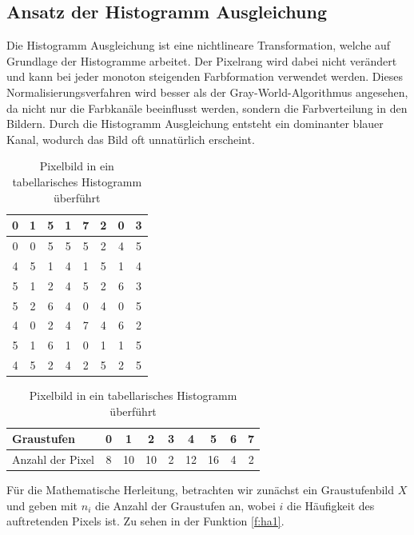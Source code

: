   \subsection{Ansatz der Histogramm Ausgleichung}\label{s.ha}  
Die Histogramm Ausgleichung \cite{goatman2003colour} ist eine nichtlineare Transformation, welche auf Grundlage der Histogramme arbeitet. Der Pixelrang wird dabei nicht verändert und kann bei jeder monoton steigenden Farbformation verwendet werden. Dieses Normalisierungsverfahren wird besser als der Gray-World-Algorithmus angesehen, da nicht nur die Farbkanäle beeinflusst werden, sondern die Farbverteilung in den Bildern. Durch die Histogramm Ausgleichung entsteht ein dominanter blauer Kanal, wodurch das Bild oft unnatürlich erscheint.
   \begin{table}
  [h]
  \centering
  \caption{Pixelbild in ein tabellarisches Histogramm überführt}
  \label{tab:bildha}
  \begin{minipage}{\textwidth}
  \center
  \begin{tabular}{|c|c|c|c|c|c|c|c|}
  \hline
  0&1&5&1&7&2&0&3\\
  \hline
  0&0&5&5&5&2&4&5\\
  \hline
  4&5&1&4&1&5&1&4\\
  \hline
  5&1&2&4&5&2&6&3\\
  \hline
  5&2&6&4&0&4&0&5\\
  \hline
  4&0&2&4&7&4&6&2\\
  \hline
  5&1&6&1&0&1&1&5\\
  \hline
  4&5&2&4&2&5&2&5\\
  \hline
  \end{tabular}
  \end{minipage}
  \begin{minipage}{\textwidth}
  \hspace{\textwidth}
  \end{minipage}
  \begin{minipage}{\textwidth}
  \center
  \begin{tabular}{|l|c|c|c|c|c|c|c|c|}
  \hline
  Graustufen & 0 & 1 & 2 & 3 & 4 & 5 & 6 & 7\\
  \hline
  Anzahl der Pixel & 8 & 10 & 10 & 2 & 12 & 16 & 4 & 2\\
  \hline
  \end{tabular}
  \end{minipage}
  \end{table}
Für die Mathematische Herleitung, betrachten wir zunächst ein Graustufenbild $X$ und geben mit $n_{i}$ die Anzahl der Graustufen an, wobei $i$ die Häufigkeit des auftretenden Pixels ist. Zu sehen in der Funktion \ref{f:ha1}.
